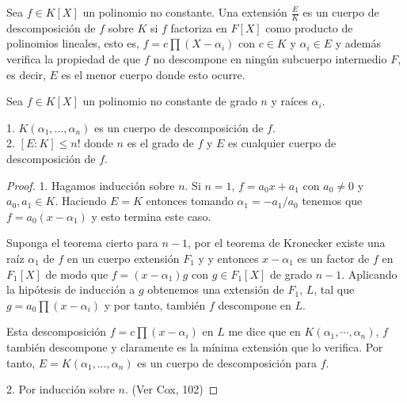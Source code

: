 \begin{definition}
Sea $f \in K[X]$ un polinomio no constante. Una extensión $\frac{E}{K}$ es un cuerpo de descomposición de $f$ sobre $K$ si $f$ factoriza en $F[X]$ como producto de polinomios lineales, esto es, $f = c \prod (X - \alpha_i)$ con $c \in K$ y $\alpha_i \in E$ y además verifica la propiedad de que $f$ no descompone en ningún subcuerpo intermedio $F$, es decir, $E$ es el menor cuerpo donde esto ocurre. 
\end{definition}

\begin{proposition}
	Sea $f \in K[X]$ un polinomio no constante de grado $n$ y raíces $\alpha_i$. 
	
	1. $K(\alpha_1,\ldots,\alpha_n)$ es un cuerpo de descomposición de $f$. \\
	2. $[E:K] \le n!$ donde $n$ es el grado de $f$ y $E$ es cualquier cuerpo de descomposición de $f$. 
\end{proposition}
\begin{proof}
	1. Hagamos inducción sobre $n$. Si $n =  1$, $f = a_0x+a_1$ con $a_0 \neq 0$ y $a_0,a_1 \in K$. Haciendo $E = K$ entonces tomando $\alpha_1 = -a_1/a_0$ tenemos que $f = a_0(x-\alpha_1)$ y esto termina este caso. 
	
	Suponga el teorema cierto para $n-1$, por el teorema de Kronecker existe una raíz $\alpha_1$ de $f$ en un cuerpo extensión $F_1$ y y entonces $x-\alpha_1$ es un factor de $f$ en $F_1[X]$ de modo que $f = (x-\alpha_1)g$ con $g \in F_1[X]$ de grado $n-1$. Aplicando la hipótesis de inducción a $g$ obtenemos una extensión de $F_1$, $L$, tal que $g = a_0 \prod (x - \alpha_i)$ y por tanto, también $f$ descompone en $L$. 
	
	Esta descomposición $f = c \prod (x - \alpha_i)$ en $L$ me dice que en $K(\alpha_1,\cdots,\alpha_n)$, $f$ también descompone y claramente es la mínima extensión que lo verifica. Por tanto, $E = K(\alpha_1,\ldots,\alpha_n)$ es un cuerpo de descomposición para $f$. 
	
	2. Por inducción sobre $n$. (Ver Cox, 102)
\end{proof}


